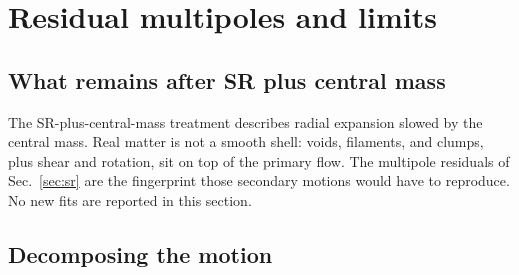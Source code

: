\documentclass[11pt,a4paper]{article}
\begin{document}
\section{Residual multipoles and limits}
\label{sec:rheology}

\subsection{What remains after SR plus central mass}

The SR-plus-central-mass treatment describes radial expansion slowed by the central mass. Real matter is not a smooth shell: voids, filaments, and clumps, plus shear and rotation, sit on top of the primary flow. The multipole residuals of Sec.~\ref{sec:sr} are the fingerprint those secondary motions would have to reproduce. No new fits are reported in this section.

\subsection{Decomposing the motion}
\end{document}
